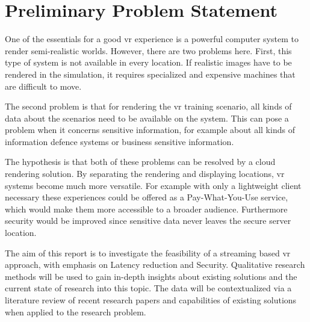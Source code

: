 \section{Preliminary Problem Statement}
One of the essentials for a good \acrfull{vr} experience is a powerful computer system to render semi-realistic
worlds. However, there are two problems here. First, this type of system is not available in every location.
If realistic images have to be rendered in the simulation, it requires specialized and expensive machines that are difficult to move. 

The second problem is that for rendering the \acrshort{vr} training scenario, all kinds of data about the scenarios need to be available on the system. 
This can pose a problem when it concerns sensitive information, for example about all kinds of information defence systems or business sensitive information.


The hypothesis is that both of these problems can be resolved by a cloud rendering solution. By separating the rendering and displaying locations, \acrshort{vr} systems become much more versatile. For example with only a lightweight client necessary these experiences could be offered as a Pay-What-You-Use service, which would make them more accessible to a broader audience. Furthermore security would be improved since sensitive data never leaves the secure server location.


The aim of this report is to investigate the feasibility of a streaming based \acrshort{vr} approach, with emphasis on Latency reduction and Security.
Qualitative research methods will be used to gain in-depth insights about existing solutions and the current state of research into this topic.
The data will be contextualized via a literature review of recent research papers and capabilities of existing solutions when applied to the research problem.